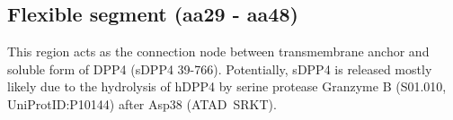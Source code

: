 \subsection{Flexible segment (aa29 - aa48)}

This region acts as the connection node between transmembrane anchor and soluble form of DPP4 (sDPP4 39-766). Potentially, sDPP4 is released  mostly likely due to the hydrolysis of hDPP4 by serine protease Granzyme B (S01.010, UniProtID:P10144) after Asp38 (ATAD~\textbar SRKT).~\cite{Song_2018} 
